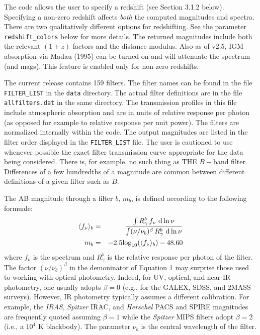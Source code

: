 \documentclass[]{article}
\begin{document}
\vspace{0.1in}
\vspace{0.1in}

\noindent
The code allows the user to specify a redshift (see Section 3.1.2 below).
Specifying a non-zero redshift affects {\it both} the computed magnitudes and
spectra.  There are two qualitatively different options for redshifting.  See
the parameter \texttt{redshift\_colors} below for more details.  The returned
magnitudes include both the relevant $(1+z)$ factors and the distance modulus.
Also as of v2.5, IGM absorption via Madau (1995) can be turned on and will
attenuate the spectrum (and mags).  This feature is enabled only for non-zero
redshifts.

\vspace{0.1in}
\vspace{0.1in}

\noindent
The current release contains 159 filters.  The filter names can be found in the
file \texttt{FILTER\_LIST} in the \texttt{data} directory.  The actual filter
definitions are in the file \texttt{allfilters.dat} in the same directory.  The
transmission profiles in this file include atmospheric absorption and are in
units of relative response per photon (as opposed for example to relative
response per unit power).  The filters are normalized internally within the
code.  The output magnitudes are listed in the filter order displayed in the
\texttt{FILTER\_LIST} file.  The user is cautioned to use whenever possible the
exact filter transmission curve appropriate for the data being considered.
There is, for example, no such thing as THE $B-$band filter.  Differences of a
few hundredths of a magnitude are common between different definitions of a
given filter such as $B$.

\vspace{0.1in}
\vspace{0.1in}

\noindent
The AB magnitude through a filter $b$, $m_b$, is defined according to the
following formuale:
\begin{eqnarray}
\langle f_\nu \rangle_b &=& \frac{\int R^b_\gamma\,f_\nu\,\,{\rm d\,
  ln}\,\nu}{\int (\nu/\nu_b)^\beta \,R^b_\gamma\,\, {\rm d \,ln}\,\nu} \\
m_b &=& -2.5{\rm log}_{10}(\langle f_\nu \rangle_b)-48.60
\end{eqnarray}
where $f_\nu$ is the spectrum and $R^b_\gamma$ is the relative response per
photon of the filter.  The factor $(\nu/\nu_b)^\beta$ in the demoninator of
Equation 1 may surprise those used to working with optical photometry.  Indeed,
for UV, optical, and near-IR photometry, one usually adopts $\beta=0$ (e.g., for
the GALEX, SDSS, and 2MASS surveys).  However, IR photometry typically assumes a
different calibration.  For example, the {\it IRAS}, {\it Spitzer} IRAC, and
{\it Herschel} PACS and SPIRE magnitudes are frequently quoted assuming
$\beta=1$ while the {\it Spitzer} MIPS filters adopt $\beta=2$ (i.e., a $10^4$ K
blackbody).  The parameter $\nu_b$ is the central wavelength of the filter.
\end{document}
